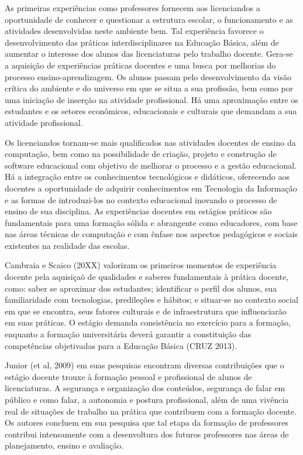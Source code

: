     
    As primeiras experiências como professores fornecem aos licenciandos a oportunidade de conhecer e questionar a estrutura escolar, o funcionamento e as atividades desenvolvidas neste ambiente bem. Tal experiência favorece o desenvolvimento das práticas interdisciplinares na Educação Básica, além de aumentar o interesse dos alunos das licenciaturas pelo trabalho docente. Gera-se a aquisição de experiências práticas docentes e uma busca por melhorias do processo ensino-aprendizagem. Os alunos passam pelo desenvolvimento da visão crítica do ambiente e do universo em que se situa a sua profissão, bem como por uma iniciação de inserção na atividade profissional. Há uma aproximação entre os estudantes e os setores econômicos, educacionais e culturais que demandam a sua atividade profissional.
	
    
    Os licenciandos tornam-se mais qualificados nas atividades docentes de ensino da computação, bem como na possibilidade de criação, projeto e construção de software educacional com objetivo de melhorar o processo e a gestão educacional. Há a integração entre os conhecimentos tecnológicos e didáticos, oferecendo aos docentes a oportunidade de adquirir conhecimentos em Tecnologia da Informação e as formas de introduzi-los no contexto educacional inovando o processo de ensino de sua disciplina. As experiências docentes em estágios práticos são fundamentais para uma formação sólida e abrangente como educadores, com base nas áreas técnicas de computação e com ênfase nos aspectos pedagógicos e sociais existentes na realidade das escolas.
	
    
    Cambraia e Scaico (20XX) valorizam os primeiros momentos de experiência docente pela aquisiçaõ de qualidades e saberes fundamentais à prática docente, como: saber se  aproximar dos estudantes;  identificar o perfil dos alunos, sua familiaridade com tecnologias, predileções e hábitos; e situar-se no contexto social em que se encontra, seus fatores culturais e de infraestrutura que influenciarão em suas práticas. O estágio demanda consistência no exercício para a formação, enquanto a formação universitária deverá garantir a constituição das competências objetivadas para a Educação Básica (CRUZ 2013).	
	
    
    Junior (et al, 2009) em suas pesquisas encontram diversas contribuições que o estágio docente trouxe à formação pessoal e profissional de alunos de licenciaturas. A segurança e organização dos conteúdos, segurança de falar em público e como falar, a autonomia e postura profissional, além de uma vivência real de situações de trabalho na prática que contribuem com a formação docente. Os autores concluem em sua pesquisa que tal etapa da formação de professores contribui intensamente com a desenvoltura dos futuros professores nas áreas de planejamento, ensino e avaliação. 
	
